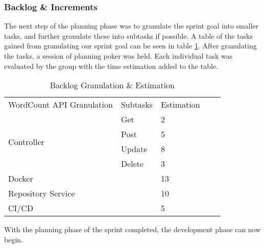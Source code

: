 \subsubsection{Backlog \& Increments}
The next step of the planning phase was to granulate the sprint goal into smaller tasks, and further granulate these into subtasks if possible.
A table of the tasks gained from granulating our sprint goal can be seen in table \ref{BacklogEstimationSprint3}. 
After granulating the tasks, a session of planning poker was held. Each individual task was evaluated by the group with the time estimation added to the table. 
\begin{table}[h]
\centering
\begin{tabular}{|l|l|l|ll}
\cline{1-3}
WordCount API Granulation   & Subtasks & Estimation &  &  \\ \cline{1-3}
\multirow{4}{*}{Controller} & Get      & 2          &  &  \\ \cline{2-3}
                            & Post     & 5          &  &  \\ \cline{2-3}
                            & Update   & 8          &  &  \\ \cline{2-3}
                            & Delete   & 3          &  &  \\ \cline{1-3}
Docker                      &          & 13         &  &  \\ \cline{1-3}
Repository Service          &          & 10         &  &  \\ \cline{1-3}
CI/CD                       &          & 5          &  &  \\ \cline{1-3}
\end{tabular}
\caption{Backlog Granulation \& Estimation}
\label{BacklogEstimationSprint3}
\end{table}

With the planning phase of the sprint completed, the development phase can now begin. 




